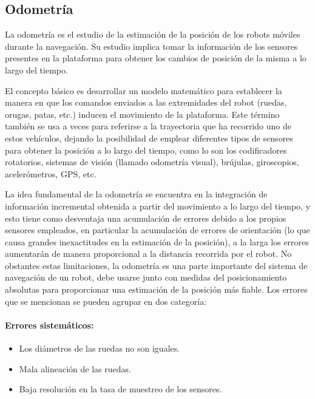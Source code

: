 \subsection{Odometría}
La odometría es el estudio de la estimación de la posición de los robots móviles durante la navegación. Su estudio implica tomar la información de los sensores presentes en la plataforma para obtener los cambios de posición de la misma a lo largo del tiempo. 
\par El concepto básico es desarrollar un modelo matemático para establecer la manera en que los comandos enviados a las extremidades del robot (ruedas, orugas, patas, etc.) inducen el movimiento de la plataforma. Este término también se usa a veces para referirse a la trayectoria que ha recorrido uno de estos vehículos, dejando la posibilidad de emplear diferentes tipos de sensores para obtener la posición a lo largo del tiempo, como lo son los codificadores rotatorios, sistemas de visión (llamado odometría visual), brújulas, giroscopios, acelerómetros, GPS, etc.
\par La idea fundamental de la odometría se encuentra en la integración de información incremental obtenida a partir del movimiento a lo largo del tiempo, y esto tiene como desventaja una acumulación de errores debido a los propios sensores empleados, en particular la acumulación de errores de orientación (lo que causa grandes inexactitudes en la estimación de la posición), a la larga los errores aumentarán de manera proporcional a la distancia recorrida por el robot. No obstantes estas limitaciones, la odometría es una parte importante del sistema de navegación de un robot, debe usarse junto con medidas del posicionamiento absolutas para proporcionar una estimación de la posición más fiable. Los errores que se mencionan se pueden agrupar en dos categoría:
\paragraph{Errores sistemáticos:}
\begin{itemize}
	\item Los diámetros de las ruedas no son iguales.
	\item Mala alineación de las ruedas.
	\item Baja resolución en la tasa de muestreo de los sensores.
\end{itemize}
